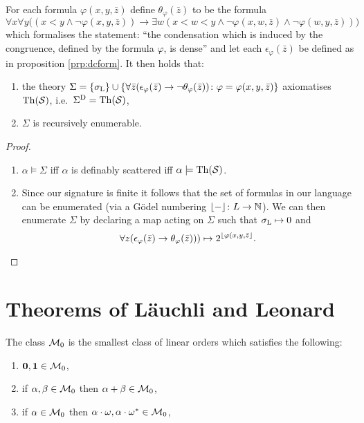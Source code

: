\begin{prp}
	For each formula $\varphi(x,y,\bar{z})$ define $\theta_\varphi(\bar{z})$ to be the formula
	\begin{equation}
		\forall x\forall y\big((x<y\wedge\neg\varphi(x,y,\bar{z}))\rightarrow\exists w(x<w<y\wedge\neg\varphi(x,w,\bar{z})\wedge\neg\varphi(w,y,\bar{z}))\big)
	\end{equation}
	which formalises the statement: ``the condensation which is induced by the congruence, defined by the formula $\varphi$, is dense'' and let each $\epsilon_\varphi(\bar{z})$ be defined as in proposition \ref{prp:dcform}.  It then holds that:
	\begin{enumerate}
		\item the theory $\Sigma=\left\lbrace \sigma_{\mathrm{L}}\right\rbrace\cup\left\lbrace \forall\bar{z}(\epsilon_\varphi(\bar{z})\rightarrow\neg\theta_\varphi(\bar{z}))\colon \varphi=\varphi(x,y,\bar{z}) \right\rbrace$ axiomatises $\operatorname{Th}(\mathcal{S})$, i.e.\ ${\Sigma}^\mathrm{D}=\operatorname{Th}(\mathcal{S})$,

		\item $\Sigma$ is recursively enumerable.
	\end{enumerate}
	\begin{proof}
		\begin{enumerate}[nosep]
			\item	$\alpha\models\Sigma$ iff $\alpha$ is definably scattered iff $\alpha\models\operatorname{Th}(\mathcal{S})$.
			\item	Since our signature is finite it follows that the set of formulas in our language can be enumerated (via a G\"odel numbering $\lfloor -\rfloor\colon L\to\mathbb{N}$).  We can then enumerate $\Sigma$ by declaring a map acting on $\Sigma$ such that $\sigma_{\mathrm{L}}\mapsto 0$ and
			\begin{equation}
				\forall z(\epsilon_\varphi(\bar{z})\rightarrow\theta_\varphi(\bar{z})))\mapsto 2^{\lfloor \varphi(x,y,\bar{z}\rfloor}.
			\end{equation}
		\end{enumerate}
	\end{proof}
\end{prp}


\section{Theorems of L\"auchli and Leonard}

\begin{dfn}
	The class $\mathcal{M}_0$ is the smallest class of linear orders which satisfies the following:
	\begin{enumerate}
		\item	$\mathbf{0},\mathbf{1}\in\mathcal{M}_0$,
		\item	if $\alpha,\beta\in\mathcal{M}_0$ then $\alpha+\beta\in\mathcal{M}_0$,
		\item	if $\alpha\in\mathcal{M}_0$ then $\alpha\cdot\omega,\alpha\cdot{\omega}^\ast\in\mathcal{M}_0$,
	\end{enumerate}
\end{dfn}

